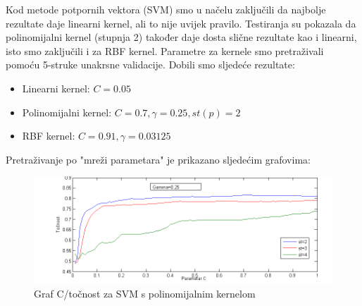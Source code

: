 \documentclass[conference]{IEEEtran}
\begin{document}

Kod metode potpornih vektora (SVM) smo u načelu zaključili da najbolje rezultate daje linearni kernel, ali to nije uvijek pravilo.  Testiranja su pokazala da polinomijalni kernel (stupnja 2) također daje dosta slične rezultate kao i linearni, isto smo zaključili i za RBF kernel. Parametre za kernele smo pretraživali pomoću 5-struke unakrsne validacije. Dobili smo sljedeće rezultate:
\begin{itemize}
	\item Linearni kernel: $C=0.05$
	\item Polinomijalni kernel: $C=0.7, \gamma =0.25, st(p)=2$
	\item RBF kernel: $C=0.91, \gamma =0.03125$
\end{itemize}
Pretraživanje po "mreži parametara" je prikazano sljedećim grafovima:
\begin{figure}[!ht]
\begin{minipage}{0.5\textwidth}
\centering
\includegraphics[width=\textwidth]{images/paramCPoly.png}
\caption{Graf C/točnost za SVM s polinomijalnim kernelom}
\end{minipage}
\end{figure}
\end{document}
